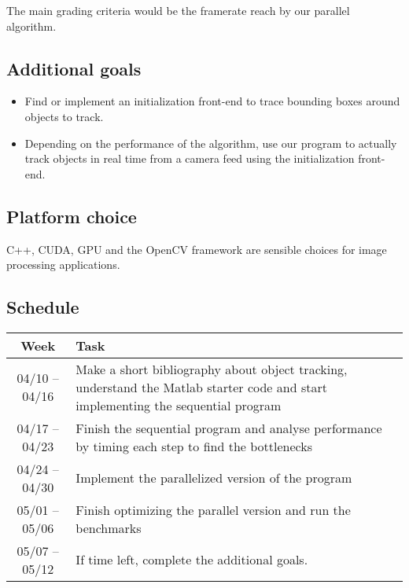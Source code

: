 \documentclass[11pt,english,letter]{article}
\begin{document}
The main grading criteria would be the framerate reach by our parallel algorithm.

\subsection{Additional goals}

\begin{itemize}
    \item Find or implement an initialization front-end to trace bounding boxes around objects to track.
    \item Depending on the performance of the algorithm, use our program to actually track objects in real time from a camera feed using the initialization front-end.
\end{itemize}

\subsection{Platform choice}

C++, CUDA, GPU and the OpenCV framework are sensible choices for image processing applications.

\subsection{Schedule}


\begin{center}
\begin{tabular}{cp{12cm}}\hline
    Week&Task\\\hline
    04/10 -- 04/16&Make a short bibliography about object tracking, understand the Matlab starter code and start implementing the sequential program\\
    04/17 -- 04/23&Finish the sequential program and analyse performance by timing each step to find the bottlenecks\\
    04/24 -- 04/30&Implement the parallelized version of the program\\
    05/01 -- 05/06&Finish optimizing the parallel version and run the benchmarks\\
    05/07 -- 05/12&If time left, complete the additional goals.\\\hline
\end{tabular}
\end{center}



\end{document}
